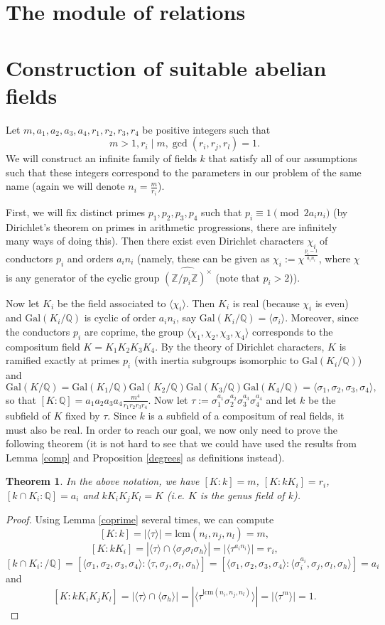 \documentclass[12pt,a4paper]{article}
\newtheorem{theorem}{Theorem}
\theoremstyle{definition}
\newcommand{\Q}{\mathbb{Q}}
\newcommand{\Z}{\mathbb{Z}}
\newcommand{\Gal}{\mathrm{Gal}}
\newcommand{\lcm}{\mathrm{lcm}}
\begin{document}
\section{The module of relations}
\section{Construction of suitable abelian fields}
Let $m,a_1,a_2,a_3,a_4,r_1,r_2,r_3,r_4$ be positive integers such that 
$$m>1, r_i\mid m, \gcd(r_i,r_j,r_l)=1.$$
We will construct an infinite family of fields $k$ that satisfy all of our assumptions such that these integers correspond to the parameters in our problem of the same name (again we will denote $n_i=\frac{m}{r_i}$).

First, we will fix distinct primes $p_1,p_2,p_3,p_4$ such that $p_i\equiv 1\pmod{ 2a_in_i}$ (by Dirichlet's theorem on primes in arithmetic progressions, there are infinitely many ways of doing this). Then there exist even Dirichlet characters $\chi_i$ of conductors $p_i$ and orders $a_in_i$ (namely, these can be given as $\chi_i:=\chi^{\frac{p_i-1}{a_in_i}}$, where $\chi$ is any generator of the cyclic group $\widehat{(\Z/p_i\Z)^\times}$ (note that $p_i>2$)).

Now let $K_i$ be the field associated to $\langle \chi_i\rangle$. Then $K_i$ is real (because $\chi_i$ is even) and $\Gal(K_i/\Q)$ is cyclic of order $a_in_i$, say $\Gal(K_i/\Q)=\langle \sigma_i\rangle$. Moreover, since the conductors $p_i$ are coprime, the group $\langle \chi_1,\chi_2,\chi_3,\chi_4\rangle$ corresponds to the compositum field $K=K_1K_2K_3K_4$. By the theory of Dirichlet characters, $K$ is ramified exactly at primes $p_i$ (with inertia subgroups isomorphic to $\Gal(K_i/\Q)$) and $$\Gal(K/\Q)=\Gal(K_1/\Q)\Gal(K_2/\Q)\Gal(K_3/\Q)\Gal(K_4/\Q)=\langle\sigma_1,\sigma_2,\sigma_3,\sigma_4\rangle,$$
so that $[K:\Q]=a_1a_2a_3a_4\frac{m^4}{r_1r_2r_3r_4}$. Now let $\tau:=\sigma_1^{a_1}\sigma_2^{a_2}\sigma_3^{a_3}\sigma_4^{a_4}$ and let $k$ be the subfield of $K$ fixed by $\tau$. Since $k$ is a subfield of a compositum of real fields, it must also be real. In order to reach our goal, we now only need to prove the following theorem (it is not hard to see that we could have used the results from Lemma \ref{comp} and Proposition \ref{degrees} as definitions instead).

\begin{theorem}
In the above notation, we have $[K:k]=m$, $[K:kK_i]=r_i$, $[k\cap K_i:\Q]=a_i$ and $kK_iK_jK_l=K$ (i.e. $K$ is the genus field of $k$).
\end{theorem}
\begin{proof}
Using Lemma \ref{coprime} several times, we can compute
$$[K:k]=|\langle\tau\rangle|=\lcm\left(n_i,n_j,n_l\right)=m,$$
$$[K:kK_i]=|\langle\tau\rangle\cap \langle\sigma_j\sigma_l\sigma_h\rangle|=|\langle\tau^{a_in_i}\rangle|=r_i,$$
$$[k\cap K_i:/\Q]=[\langle\sigma_1,\sigma_2,\sigma_3,\sigma_4\rangle:\langle\tau,\sigma_j,\sigma_l,\sigma_h\rangle]=[\langle\sigma_1,\sigma_2,\sigma_3,\sigma_4\rangle:\langle\sigma_i^{a_i},\sigma_j,\sigma_l,\sigma_h\rangle]=a_i$$
and
$$[K:kK_iK_jK_l]=|\langle\tau\rangle\cap \langle\sigma_h\rangle|=|\langle\tau^{\lcm\left(n_i,n_j,n_l\right)}\rangle|=|\langle\tau^m\rangle|=1.$$
\end{proof}
\end{document}
